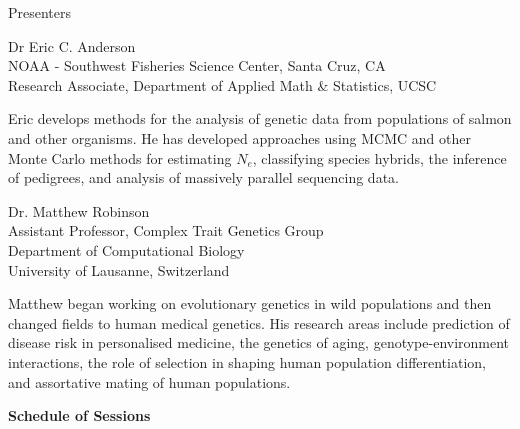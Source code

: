 
\vspace*{1in}
\begin{center}\color{section0}\bf\Large
\coursetitlepage
\end{center}
\es\bs

\begin{center}\color{section0} Presenters\end{center}
\enlargethispage*{1000pt}

{\small
{\color{section0}Dr Eric C. Anderson\\
NOAA - Southwest Fisheries Science Center, Santa Cruz, CA\\
Research Associate, Department of Applied Math \& Statistics, UCSC}

Eric develops methods for the analysis of genetic data from populations of salmon and other organisms.  He has developed approaches using MCMC and other Monte Carlo methods for estimating $N_e$, classifying species hybrids, the inference of pedigrees, and analysis of massively parallel sequencing data.

{\color{section0}Dr. Matthew Robinson \\
Assistant Professor, Complex Trait Genetics Group\\
Department of Computational Biology \\
University of Lausanne, Switzerland}
  
Matthew began working on evolutionary genetics in wild populations and then changed fields to human 
medical genetics.  His research areas include 
prediction of disease risk in personalised medicine, the genetics of aging,
genotype-environment interactions, the role of selection in shaping human
population differentiation, and assortative mating of human populations.

}

\es\bs
\begin{center}
{\color{section0}\bf\Large Schedule of Sessions}
\vspace*{.25in}
\enlargethispage*{1000pt}

%

%

\end{center}


